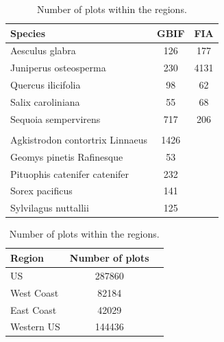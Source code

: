 \begin{table}
    \begin{minipage}{.5\linewidth}
      
      \centering
        \begin{tabular}{lcc}
            \toprule
            Species & GBIF & FIA \\
            \midrule
Aesculus glabra & 126 & 177 \\
Juniperus osteosperma & 230 & 4131\\
Quercus ilicifolia & 98 & 62 \\
Salix caroliniana &  55 & 68  \\ 
Sequoia sempervirens & 717 & 206 \\
\\
Agkistrodon contortrix Linnaeus & 1426 & \\
Geomys pinetis Rafinesque & 53 & \\
Pituophis catenifer catenifer & 232 & \\
Sorex pacificus  & 141 & \\
Sylvilagus nuttallii & 125 & \\
            \bottomrule
        \end{tabular}
        \caption{\label{table:NrObs}Number of occurrence observations.}
    \end{minipage}%
    \qquad
    \begin{minipage}{.5\linewidth}
      \centering
        \begin{tabular}{lcc}
        \toprule
        Region & Number of plots \\
        \midrule
            US & 287860 \\
            West Coast &  82184 \\
            East Coast &  42029 \\
            Western US &  144436 \\
            \bottomrule
        \end{tabular}
        \caption{\label{table:PlotsRegion}Number of plots within the regions.}
    \end{minipage} 
\end{table}




